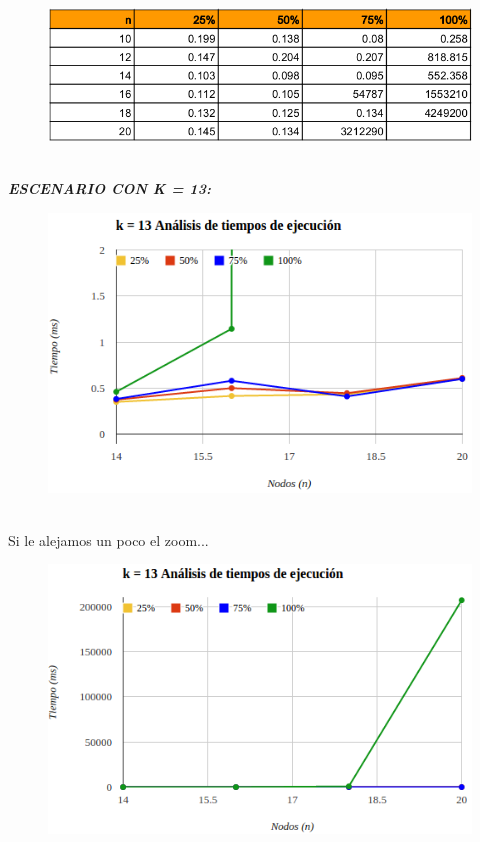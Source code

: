 \documentclass[10pt,a4paper]{article}
\begin{document}
	\begin{figure}[h]
		\begin{center}
		   \includegraphics[scale=0.50]{graficos/tablak8.png}
		\end{center}
	\end{figure}\\
	
\newpage
\textbf{\textit{ESCENARIO CON K = 13:}}
	\begin{figure}[h]
		\begin{center}
		   \includegraphics[scale=0.50]{graficos/k13ConZoom.png}
		\end{center}
	\end{figure}\\
\indent Si le alejamos un poco el zoom...
	\begin{figure}[h]
		\begin{center}
		   \includegraphics[scale=0.50]{graficos/k13SinZoom.png}
		\end{center}
	\end{figure}
\end{document}
